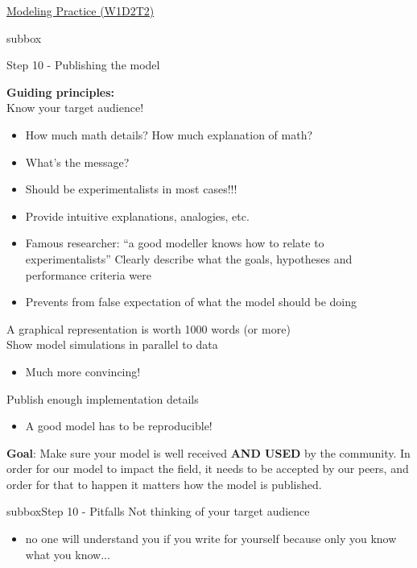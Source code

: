 \begin{textbox}{\href{https://compneuro.neuromatch.io/tutorials/W1D2_ModelingPractice/W1D2_Intro.html}{Modeling Practice  (W1D2T2)} }

\begin{subbox}{subbox}{Step 10 - Publishing the model

}
\scriptsize

\textbf{Guiding principles:}\\
Know your target audience!
  \begin{itemize}
    \item How much math details? How much explanation of math?
  \item  What’s the message?
 \item  Should be experimentalists in most cases!!!
  \end{itemize}
    \begin{itemize}
    \item Provide intuitive explanations, analogies, etc.
    \item  Famous researcher: “a good modeller knows how to relate to experimentalists”
Clearly describe what the goals, hypotheses and performance criteria were
\end{itemize}
  \begin{itemize}
    \item Prevents from false expectation of what the model should be doing
    \end{itemize}
A graphical representation is worth 1000 words (or more)\\
Show model simulations in parallel to data
  \begin{itemize}
    \item Much more convincing!
    \end{itemize}
Publish enough implementation details
  \begin{itemize}
    \item A good model has to be reproducible! 
\end{itemize}
\textbf{Goal}: Make sure your model is well received \textbf{AND USED} by the community. In order for our model to impact the field, it needs to be accepted by our peers, and order for that to happen it matters how the model is published.


 \end{subbox}
\begin{subbox}{subbox}{Step 10 - Pitfalls }
\scriptsize
Not thinking of your target audience
\begin{itemize}
    \item no one will understand you if you write for yourself because only you know what you know...\end{itemize}


\end{subbox}
\end{textbox}
